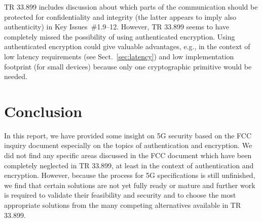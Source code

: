 \documentclass[lnicst,sechang,a4paper]{svmultln}
\begin{document}
TR 33.899 includes discussion about which parts of the communication should be protected for confidentiality and integrity (the latter appears to imply also authenticity) in Key Issues~\#1.9--12. However, TR 33.899 seems to have completely missed the possibility of using authenticated encryption. Using authenticated encryption could give valuable advantages, e.g., in the context of low latency requirements (see Sect.~\ref{sec:latency}) and low implementation footprint (for small devices) because only one cryptographic primitive would be needed.


\section{Conclusion}
\label{sec:conclusion}

In this report, we have provided some insight on 5G security based on the FCC inquiry document especially on the topics of authentication and encryption. %
We did not find any specific areas discussed in the FCC document which have been completely neglected in TR 33.899, at least in the context of authentication and encryption. However, because the process for 5G specifications is still unfinished, we find that certain solutions are not yet fully ready or mature and further work is required to validate their feasibility and security and to choose the most appropriate solutions from the many competing alternatives available in TR 33.899.







\end{document}
